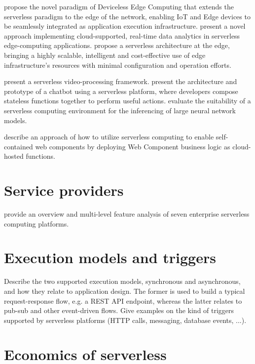 \documentclass[utf8,english]{gradu3}
\begin{document}
\textcite{glikson17devicelessedge} propose the novel paradigm of Deviceless Edge Computing that extends the serverless paradigm to the edge of the network, enabling IoT and Edge devices to be seamlessly integrated as application execution infrastructure. \textcite{nastic17analyticsedge} present a novel approach implementing cloud-supported, real-time data analytics in serverless edge-computing applications. \textcite{baresi17edgecomputing} propose a serverless architecture at the edge, bringing a highly scalable, intelligent and cost-effective use of edge infrastructure’s resources with minimal configuration and operation efforts.

\textcite{fouladi2017encoding} present a serverless video-processing framework. \textcite{yan16chatbot} present the architecture and prototype of a chatbot using a serverless platform, where developers compose stateless functions together to perform useful actions. \textcite{ishakian17neural} evaluate the suitability of a serverless computing environment for the inferencing of large neural network models.

\textcite{ast17webcomponent} describe an approach of how to utilize serverless computing to enable self-contained web components by deploying Web Component business logic as cloud-hosted functions.

\section{Service providers}

\textcite{lynn2017preliminary} provide an overview and multi-level feature analysis of seven enterprise serverless computing platforms.

\section{Execution models and triggers}

Describe the two supported execution models, synchronous and asynchronous, and how they relate to application design. The former is used to build a typical request-response flow, e.g. a REST API endpoint, whereas the latter relates to pub-sub and other event-driven flows. Give examples on the kind of triggers supported by serverless platforms (HTTP calls, messaging, database events, ...).

\section{Economics of serverless}
\end{document}
